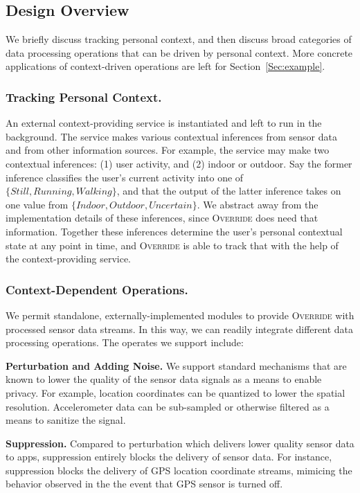 \documentclass[10pt]{sensys-proc}
\begin{document}
\subsection{Design Overview}

We briefly discuss tracking personal context, and then discuss broad categories of data processing operations that can be driven by personal context. More concrete applications of context-driven operations are left for Section~\ref{Sec:example}.

\subsubsection{Tracking Personal Context.}

An external context-providing service is instantiated and left to run in the background. The service makes various contextual inferences from sensor data and from other information sources. For example, the service may make two contextual inferences: (1) user activity, and (2) indoor or outdoor. Say the former inference classifies the user's current activity into one of $\{Still, Running, Walking\}$, and that the output of the latter inference takes on one value from $\{Indoor, Outdoor, Uncertain\}$. We abstract away from the implementation details of these inferences, since \textsc{Override} does need that information. Together these inferences determine the user's personal contextual state at any point in time, and \textsc{Override} is able to track that with the help of the context-providing service.

\subsubsection{Context-Dependent Operations.}
We permit standalone, externally-implemented modules to provide \textsc{Override} with processed sensor data streams. In this way, we can readily integrate different data processing operations. The operates we support include:

\textbf{Perturbation and Adding Noise.} We support standard mechanisms that are known to lower the quality of the sensor data signals as a means to enable privacy. For example, location coordinates can be quantized to lower the spatial resolution. Accelerometer data can be sub-sampled or otherwise filtered as a means to sanitize the signal.

\textbf{Suppression.} Compared  to perturbation which delivers lower quality sensor data to apps, suppression entirely blocks the delivery of sensor data. For instance, suppression blocks the delivery of GPS location coordinate streams, mimicing the behavior observed in the the event that GPS sensor is turned off.
\end{document}
